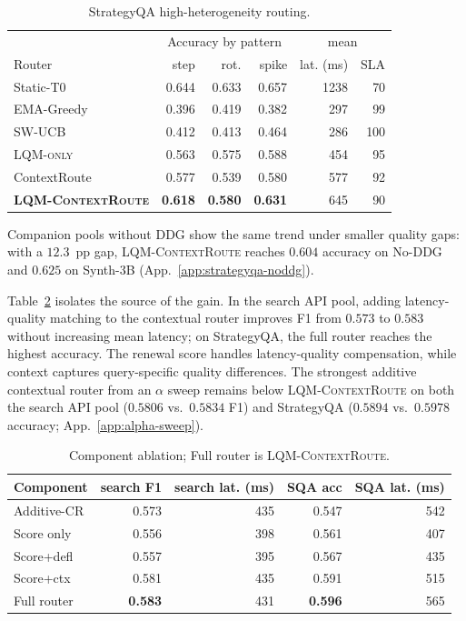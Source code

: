 \documentclass[11pt]{article}
\newcommand{\lqm}{\textsc{LQM-only}}
\newcommand{\lqmcr}{\textsc{LQM-ContextRoute}}
\begin{document}
\begin{table}[t]
\centering\scriptsize
\setlength{\tabcolsep}{4pt}
\begin{tabular}{l rrr rr}
\toprule
& \multicolumn{3}{c}{Accuracy by pattern} & \multicolumn{2}{c}{mean} \\
Router & step & rot. & spike & lat. (ms) & SLA \\
\midrule
Static-T0    & 0.644 & 0.633 & 0.657 & 1238 & 70 \\
EMA-Greedy   & 0.396 & 0.419 & 0.382 &  297 & 99 \\
SW-UCB       & 0.412 & 0.413 & 0.464 &  286 & 100 \\
\lqm{}       & 0.563 & 0.575 & 0.588 &  454 & 95 \\
ContextRoute & 0.577 & 0.539 & 0.580 &  577 & 92 \\
\textbf{\lqmcr{}} & \textbf{0.618} & \textbf{0.580} & \textbf{0.631} & 645 & 90 \\
\bottomrule
\end{tabular}
\caption{StrategyQA high-heterogeneity routing.}
\label{tab:strategyqa}
\end{table}

Companion pools without DDG show the same trend under smaller quality gaps: with a $12.3$~pp gap, \lqmcr{} reaches $0.604$ accuracy on No-DDG and $0.625$ on Synth-3B (App.~\ref{app:strategyqa-noddg}).

Table~\ref{tab:component-ablation} isolates the source of the gain. In the search API pool, adding latency-quality matching to the contextual router improves F1 from $0.573$ to $0.583$ without increasing mean latency; on StrategyQA, the full router reaches the highest accuracy. The renewal score handles latency-quality compensation, while context captures query-specific quality differences. The strongest additive contextual router from an $\alpha$ sweep remains below \lqmcr{} on both the search API pool ($0.5806$ vs.\ $0.5834$ F1) and StrategyQA ($0.5894$ vs.\ $0.5978$ accuracy; App.~\ref{app:alpha-sweep}).

\begin{table}[t]
\centering\scriptsize
\setlength{\tabcolsep}{4pt}
\begin{tabular}{lrrrr}
\toprule
Component & search F1 & search lat. (ms) & SQA acc & SQA lat. (ms) \\
\midrule
Additive-CR & 0.573 & 435 & 0.547 & 542 \\
Score only & 0.556 & 398 & 0.561 & 407 \\
Score+defl & 0.557 & 395 & 0.567 & 435 \\
Score+ctx & 0.581 & 435 & 0.591 & 515 \\
Full router & \textbf{0.583} & 431 & \textbf{0.596} & 565 \\
\bottomrule
\end{tabular}
\caption{Component ablation; Full router is \lqmcr{}.}
\label{tab:component-ablation}
\end{table}
\end{document}
